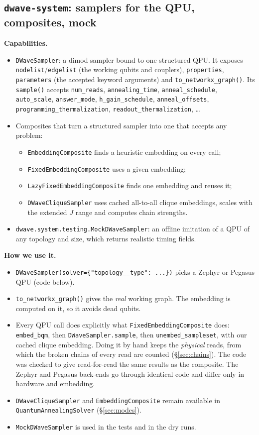 \documentclass[11pt,a4paper]{article}
\newcommand{\code}[1]{\nolinkurl{#1}}
\begin{document}
\subsection{\texorpdfstring{\code{dwave-system}}{dwave-system}: samplers for the QPU, composites, mock}
\textbf{Capabilities.}
\begin{itemize}
\item \code{DWaveSampler}: a dimod sampler bound to one structured QPU. It exposes \code{nodelist}/\code{edgelist} (the working qubits and couplers), \code{properties}, \code{parameters} (the accepted keyword arguments) and \code{to_networkx_graph()}. Its \code{sample()} accepts \code{num_reads}, \code{annealing_time}, \code{anneal_schedule}, \code{auto_scale}, \code{answer_mode}, \code{h_gain_schedule}, \code{anneal_offsets}, \code{programming_thermalization}, \code{readout_thermalization}, \dots
\item Composites that turn a structured sampler into one that accepts any problem:
\begin{itemize}
\item \code{EmbeddingComposite} finds a heuristic embedding on every call;
\item \code{FixedEmbeddingComposite} uses a given embedding;
\item \code{LazyFixedEmbeddingComposite} finds one embedding and reuses it;
\item \code{DWaveCliqueSampler} uses cached all-to-all clique embeddings, scales with the extended $J$ range and computes chain strengths.
\end{itemize}
\item \code{dwave.system.testing.MockDWaveSampler}: an offline imitation of a QPU of any topology and size, which returns realistic timing fields.
\end{itemize}

\textbf{How we use it.}
\begin{itemize}
\item \code{DWaveSampler(solver={"topology__type": ...})} picks a Zephyr or Pegasus QPU (code below).
\item \code{to_networkx_graph()} gives the \emph{real} working graph. The embedding is computed on it, so it avoids dead qubits.
\item Every QPU call does explicitly what \code{FixedEmbeddingComposite} does: \code{embed_bqm}, then \code{DWaveSampler.sample}, then \code{unembed_sampleset}, with our cached clique embedding. Doing it by hand keeps the \emph{physical} reads, from which the broken chains of every read are counted (\S\ref{sec:chains}). The code was checked to give read-for-read the same results as the composite. The Zephyr and Pegasus back-ends go through identical code and differ only in hardware and embedding.
\item \code{DWaveCliqueSampler} and \code{EmbeddingComposite} remain available in \code{QuantumAnnealingSolver} (\S\ref{sec:modes}).
\item \code{MockDWaveSampler} is used in the tests and in the dry runs.
\end{itemize}
\end{document}
